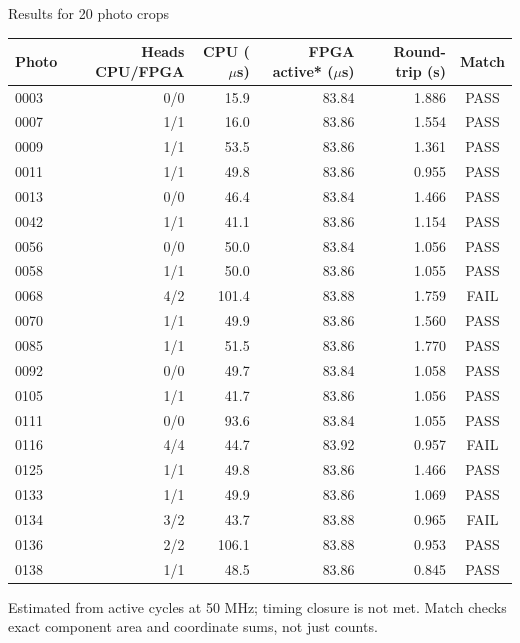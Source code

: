\documentclass[aspectratio=169,10pt]{beamer}
\begin{document}
\begin{frame}{Results for 20 photo crops}
\centering\scriptsize
\setlength{\tabcolsep}{8pt}\renewcommand{\arraystretch}{0.95}
\begin{tabular}{lrrrrc}
\toprule
Photo & Heads CPU/FPGA & CPU ($\mu$s) & FPGA active* ($\mu$s) & Round-trip (s) & Match \\
\midrule
0003 & 0/0 & 15.9 & 83.84 & 1.886 & \textcolor{passgreen}{PASS} \\
0007 & 1/1 & 16.0 & 83.86 & 1.554 & \textcolor{passgreen}{PASS} \\
0009 & 1/1 & 53.5 & 83.86 & 1.361 & \textcolor{passgreen}{PASS} \\
0011 & 1/1 & 49.8 & 83.86 & 0.955 & \textcolor{passgreen}{PASS} \\
0013 & 0/0 & 46.4 & 83.84 & 1.466 & \textcolor{passgreen}{PASS} \\
0042 & 1/1 & 41.1 & 83.86 & 1.154 & \textcolor{passgreen}{PASS} \\
0056 & 0/0 & 50.0 & 83.84 & 1.056 & \textcolor{passgreen}{PASS} \\
0058 & 1/1 & 50.0 & 83.86 & 1.055 & \textcolor{passgreen}{PASS} \\
0068 & 4/2 & 101.4 & 83.88 & 1.759 & \textcolor{failred}{FAIL} \\
0070 & 1/1 & 49.9 & 83.86 & 1.560 & \textcolor{passgreen}{PASS} \\
0085 & 1/1 & 51.5 & 83.86 & 1.770 & \textcolor{passgreen}{PASS} \\
0092 & 0/0 & 49.7 & 83.84 & 1.058 & \textcolor{passgreen}{PASS} \\
0105 & 1/1 & 41.7 & 83.86 & 1.056 & \textcolor{passgreen}{PASS} \\
0111 & 0/0 & 93.6 & 83.84 & 1.055 & \textcolor{passgreen}{PASS} \\
0116 & 4/4 & 44.7 & 83.92 & 0.957 & \textcolor{failred}{FAIL} \\
0125 & 1/1 & 49.8 & 83.86 & 1.466 & \textcolor{passgreen}{PASS} \\
0133 & 1/1 & 49.9 & 83.86 & 1.069 & \textcolor{passgreen}{PASS} \\
0134 & 3/2 & 43.7 & 83.88 & 0.965 & \textcolor{failred}{FAIL} \\
0136 & 2/2 & 106.1 & 83.88 & 0.953 & \textcolor{passgreen}{PASS} \\
0138 & 1/1 & 48.5 & 83.86 & 0.845 & \textcolor{passgreen}{PASS} \\
\bottomrule
\end{tabular}
\par\medskip *Estimated from active cycles at 50 MHz; timing closure is not met. Match checks exact component area and coordinate sums, not just counts.
\end{frame}
\end{document}
